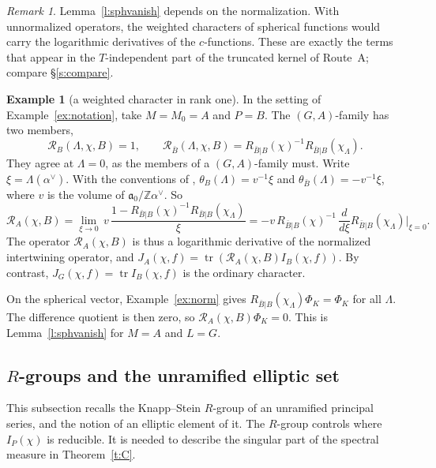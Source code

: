 \documentclass[12pt,letterpaper]{article}
\numberwithin{equation}{section}
\theoremstyle{plain}
\theoremstyle{definition}
\newtheorem{example}[theorem]{Example}
\theoremstyle{remark}
\newtheorem{remark}[theorem]{Remark}
\newcommand{\fa}{\mathfrak{a}}
\DeclareMathOperator{\tr}{tr}
\begin{document}
\begin{remark}\label{l:sphvanish:rem}
Lemma~\ref{l:sphvanish} depends on the normalization. With unnormalized operators, the weighted characters of spherical functions would carry the logarithmic derivatives of the $c$-functions. These are exactly the terms that appear in the $T$-independent part of the truncated kernel of Route~A; compare \S\ref{s:compare}.
\end{remark}

\begin{example}[a weighted character in rank one]\label{ex:wchar}
In the setting of Example~\ref{ex:notation}, take $M=M_0=A$ and $P=B$. The $(G,A)$-family has two members,
\[
\mathcal R_B(\Lambda,\chi,B)=1,\qquad \mathcal R_{\bar B}(\Lambda,\chi,B)=R_{\bar B|B}(\chi)^{-1}R_{\bar B|B}(\chi_\Lambda).
\]
They agree at $\Lambda=0$, as the members of a $(G,A)$-family must. Write $\xi=\Lambda(\alpha^\vee)$. With the conventions of \cite[Example~2.5]{JC26}, $\theta_B(\Lambda)=v^{-1}\xi$ and $\theta_{\bar B}(\Lambda)=-v^{-1}\xi$, where $v$ is the volume of $\fa_0/\mathbb{Z}\alpha^\vee$. So
\[
\mathcal R_A(\chi,B)=\lim_{\xi\to0}\,v\,\frac{1-R_{\bar B|B}(\chi)^{-1}R_{\bar B|B}(\chi_\Lambda)}{\xi}=-v\,R_{\bar B|B}(\chi)^{-1}\,\frac{d}{d\xi}R_{\bar B|B}(\chi_\Lambda)\Big|_{\xi=0}.
\]
The operator $\mathcal R_A(\chi,B)$ is thus a logarithmic derivative of the normalized intertwining operator, and $J_A(\chi,f)=\tr(\mathcal R_A(\chi,B)I_B(\chi,f))$. By contrast, $J_G(\chi,f)=\tr I_B(\chi,f)$ is the ordinary character.

On the spherical vector, Example~\ref{ex:norm} gives $R_{\bar B|B}(\chi_\Lambda)\Phi_K=\Phi_K$ for all $\Lambda$. The difference quotient is then zero, so $\mathcal R_A(\chi,B)\Phi_K=0$. This is Lemma~\ref{l:sphvanish} for $M=A$ and $L=G$.
\end{example}

\subsection{\texorpdfstring{$R$}{R}-groups and the unramified elliptic set}\label{s:R}

This subsection recalls the Knapp--Stein $R$-group of an unramified principal series, and the notion of an elliptic element of it. The $R$-group controls where $I_P(\chi)$ is reducible. It is needed to describe the singular part of the spectral measure in Theorem~\ref{t:C}.
\end{document}

